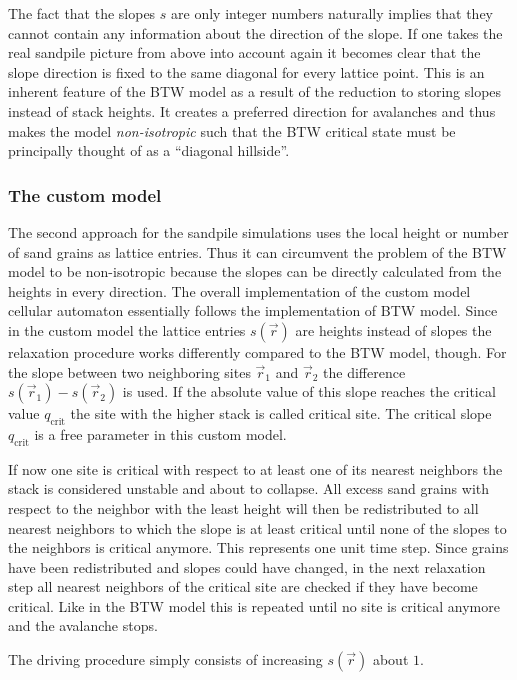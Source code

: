 The fact that the slopes $s$ are only integer numbers naturally implies that they cannot contain any information about
the direction of the slope. If one takes the real sandpile picture from above into account again it becomes clear that
the slope direction is fixed to the same diagonal for every lattice point. This is an inherent feature of the BTW model
as a result of the reduction to storing slopes instead of stack heights. It creates a preferred direction for avalanches
and thus makes the model \emph{non-isotropic} such that the BTW critical state must be principally thought of as a
\enquote{diagonal hillside}.

\subsubsection{The custom model}
The second approach for the sandpile simulations uses the local height or number of sand grains as lattice entries.
Thus it can circumvent the problem of the BTW model to be non-isotropic because the slopes can be directly calculated
from the heights in every direction.
The overall implementation of the custom model cellular automaton essentially follows the implementation of BTW model.
Since in the custom model the lattice entries $s(\vec{r})$ are heights instead of slopes the relaxation procedure
works differently compared to the BTW model, though.
For the slope between two neighboring sites $\vec{r}_1$ and $\vec{r}_2$ the difference $s(\vec{r}_1)-s(\vec{r}_2)$ is
used. If the absolute value of this slope reaches the critical value $q_{\mathrm{crit}}$ the site with the higher
stack is called critical site. The critical slope $q_{\mathrm{crit}}$ is a free parameter in this custom model.

If now one site is critical with respect to at least one of its nearest neighbors the stack is considered unstable
and about to collapse. All excess sand grains with respect to the neighbor with the least height will then be
redistributed to all nearest neighbors to which the slope is at least critical until none of the slopes to the neighbors
is critical anymore. This represents one unit time step.
Since grains have been redistributed and slopes could have changed, in the next relaxation step all nearest neighbors
of the critical site are checked if they have become critical. Like in the BTW model this is repeated until no site
is critical anymore and the avalanche stops.

The driving procedure simply consists of increasing $s(\vec{r})$ about $1$.

